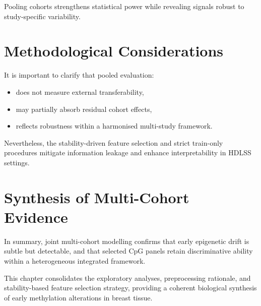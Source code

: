 Pooling cohorts strengthens statistical power
while revealing signals robust to study-specific variability.

\section{Methodological Considerations}

It is important to clarify that pooled evaluation:

\begin{itemize}
\item does not measure external transferability,
\item may partially absorb residual cohort effects,
\item reflects robustness within a harmonised multi-study framework.
\end{itemize}

Nevertheless, the stability-driven feature selection
and strict train-only procedures
mitigate information leakage
and enhance interpretability in HDLSS settings.

\section{Synthesis of Multi-Cohort Evidence}

In summary,
joint multi-cohort modelling confirms that
early epigenetic drift is subtle but detectable,
and that selected CpG panels retain discriminative ability
within a heterogeneous integrated framework.

This chapter consolidates the exploratory analyses,
preprocessing rationale,
and stability-based feature selection strategy,
providing a coherent biological synthesis
of early methylation alterations in breast tissue.